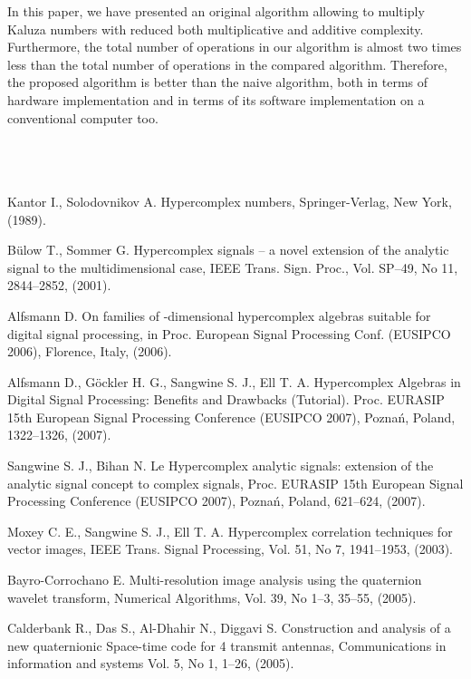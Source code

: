 \documentclass{jtacs}
\numberwithin{equation}{section}
\begin{document}
In this paper, we have presented an original algorithm allowing to multiply Kaluza numbers with reduced both multiplicative and additive complexity. Furthermore, the total number of operations in our algorithm is almost two times less than the total number of operations in the compared algorithm. Therefore, the proposed algorithm is better than the naive algorithm, both in terms of hardware implementation and in terms of its software implementation on a conventional computer too.
\\
\\
\\
\\
\begin{thebibliography}{26}

 Kantor I., Solodovnikov A. Hypercomplex numbers, Springer-Verlag, New York, (1989).

 B\"{u}low T., Sommer G. Hypercomplex signals – a novel extension of the analytic signal to the
multidimensional case, IEEE Trans. Sign. Proc., Vol. SP--49, No 11, 2844--2852, (2001).

 Alfsmann D. On families of -dimensional hypercomplex algebras suitable for digital signal
processing, in Proc. European Signal Processing Conf. (EUSIPCO 2006), Florence, Italy,
(2006).

 Alfsmann D., G\"{o}ckler H. G., Sangwine S. J., Ell T. A. Hypercomplex Algebras in Digital Signal
Processing: Benefits and Drawbacks (Tutorial). Proc. EURASIP 15th European Signal Processing
Conference (EUSIPCO 2007), Pozna\'{n}, Poland, 1322--1326, (2007).

 Sangwine S. J., Bihan N. Le Hypercomplex analytic signals: extension of the analytic signal
concept to complex signals, Proc. EURASIP 15th European Signal Processing Conference
(EUSIPCO 2007), Pozna\'{n}, Poland, 621--624, (2007).

 Moxey C. E., Sangwine S. J., Ell T. A. Hypercomplex correlation techniques for vector images,
IEEE Trans. Signal Processing, Vol. 51, No 7, 1941--1953, (2003).

 Bayro-Corrochano E. Multi-resolution image analysis using the quaternion wavelet transform,
Numerical Algorithms, Vol. 39, No 1--3, 35--55, (2005).

 Calderbank R., Das S., Al-Dhahir N., Diggavi S. Construction and analysis of a new quaternionic
Space-time code for 4 transmit antennas, Communications in information and systems Vol. 5, No 1, 1--26, (2005).


\end{thebibliography}
\end{document}
